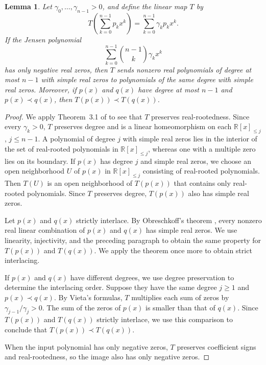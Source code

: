 \documentclass[10pt,a4paper]{article}
\numberwithin{equation}{section}
\newtheorem{lemma}[theorem]{Lemma}
\theoremstyle{remark}\newtheorem{remark}[theorem]{Remark}
\begin{document}
\begin{lemma}\label{c:lem:strictmult}
Let $\gamma_0,\ldots,\gamma_{n-1}>0$, and define the linear map $T$ by
\[
 T\!\left(\sum_{k=0}^{n-1}p_kx^k\right)=
 \sum_{k=0}^{n-1}\gamma_kp_kx^k.
\]
If the Jensen polynomial
\[
 \sum_{k=0}^{n-1}\binom{n-1}{k}\gamma_kx^k
\]
has only negative real zeros, then $T$ sends nonzero real polynomials
of degree at most $n-1$ with simple real zeros to polynomials of the same
degree with simple real zeros. Moreover, if $p(x)$ and $q(x)$ have degree
at most $n-1$ and $p(x)\prec q(x)$, then $T(p(x))\prec T(q(x))$.
\end{lemma}
\begin{proof}
We apply Theorem~3.1 of \cite{CC} to see that $T$ preserves real-rootedness.
Since every $\gamma_k>0$, $T$ preserves degree and is a linear
homeomorphism on each $\mathbb R[x]_{\le j}$, $j\le n-1$.
A polynomial of degree $j$ with simple real zeros lies in the interior of
the set of real-rooted polynomials in $\mathbb R[x]_{\le j}$,
whereas one with a multiple zero lies on its boundary.
If $p(x)$ has degree $j$ and simple real zeros, we choose an open
neighborhood $U$ of $p(x)$ in $\mathbb R[x]_{\le j}$ consisting
of real-rooted polynomials. Then $T(U)$ is an open neighborhood
of $T(p(x))$ that contains only real-rooted polynomials. Since $T$ preserves
degree, $T(p(x))$ also has simple real zeros.

Let $p(x)$ and $q(x)$ strictly interlace. By Obreschkoff's theorem
\cite[Theorem 8]{Branden}, every nonzero real linear combination of
$p(x)$ and $q(x)$ has simple real zeros. We use linearity, injectivity, and
the preceding paragraph to obtain the same property for $T(p(x))$ and
$T(q(x))$. We apply the theorem once more to obtain strict interlacing.

If $p(x)$ and $q(x)$ have different degrees, we use degree
preservation to determine the interlacing order. Suppose they have the
same degree $j\ge1$ and $p(x)\prec q(x)$. By Vieta's formulas, $T$
multiplies each sum of zeros by $\gamma_{j-1}/\gamma_j>0$.
The sum of the zeros of $p(x)$ is smaller than that of $q(x)$.
Since $T(p(x))$ and $T(q(x))$ strictly interlace, we use this comparison
to conclude that $T(p(x))\prec T(q(x))$.

When the input polynomial has only negative zeros, $T$ preserves
coefficient signs and real-rootedness, so the image also has only negative zeros.
\end{proof}
\end{document}
